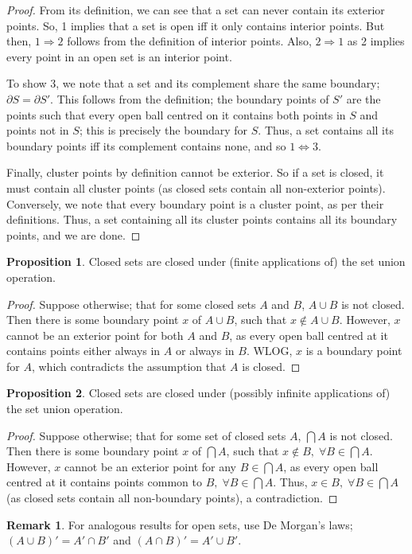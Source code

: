 \documentclass{article}
\theoremstyle{definition}
\newtheorem{rmk}{Remark}[subsubsection]
\newtheorem{prop}{Proposition}[subsubsection]
\begin{document}
\begin{proof}
	From its definition, we can see that a set can never contain its exterior points. So, 1 implies that a set is open iff it only contains interior points. But then, $1\Rightarrow2$ follows from the definition of interior points. Also, $2\Rightarrow1$ as 2 implies every point in an open set is an interior point.\par
	
	To show 3, we note that a set and its complement share the same boundary; $\partial S=\partial S'$. This follows from the definition; the boundary points of $S'$ are the points such that every open ball centred on it contains both points in $S$ and points not in $S$; this is precisely the boundary for $S$. Thus, a set contains all its boundary points iff its complement contains none, and so $1\iff3$.\par

	Finally, cluster points by definition cannot be exterior. So if a set is closed, it must contain all cluster points (as closed sets contain all non-exterior points). Conversely, we note that every boundary point is a cluster point, as per their definitions. Thus, a set containing all its cluster points contains all its boundary points, and we are done.
\end{proof}
\begin{prop}
	Closed sets are closed under (finite applications of) the set union operation.
\end{prop}
\begin{proof}
	Suppose otherwise; that for some closed sets $A$ and $B$, $A\cup B$ is not closed. Then there is some boundary point $x$ of $A\cup B$, such that $x\not\in A\cup B$. However, $x$ cannot be an exterior point for both $A$ and $B$, as every open ball centred at it contains points either always in $A$ or always in $B$. WLOG, $x$ is a boundary point for $A$, which contradicts the assumption that $A$ is closed.
\end{proof}
\begin{prop}
	Closed sets are closed under (possibly infinite applications of) the set union operation.
\end{prop}
\begin{proof}
	Suppose otherwise; that for some set of closed sets $A$, $\bigcap A$ is not closed. Then there is some boundary point $x$ of $\bigcap A$, such that $x\not\in B,\;\forall B\in\bigcap A$. However, $x$ cannot be an exterior point for any $B\in\bigcap A$, as every open ball centred at it contains points common to $B,\;\forall B\in\bigcap A$. Thus, $x\in B,\;\forall B\in\bigcap A$ (as closed sets contain all non-boundary points), a contradiction.
\end{proof}
\begin{rmk}
	For analogous results for open sets, use De Morgan's laws; $(A\cup B)'=A'\cap B'$ and $(A\cap B)'=A'\cup B'$.
\end{rmk}
\end{document}
